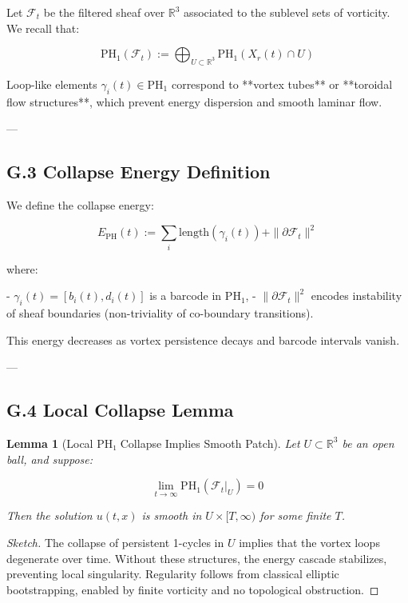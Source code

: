 \documentclass[11pt]{article}
\newtheorem{lemma}[theorem]{Lemma}
\begin{document}
Let \( \mathcal{F}_t \) be the filtered sheaf over \( \mathbb{R}^3 \) associated to the sublevel sets of vorticity.  
We recall that:

\[
\mathrm{PH}_1(\mathcal{F}_t) := \bigoplus_{U \subset \mathbb{R}^3} \mathrm{PH}_1(X_r(t) \cap U)
\]

Loop-like elements \( \gamma_i(t) \in \mathrm{PH}_1 \) correspond to **vortex tubes** or **toroidal flow structures**, which prevent energy dispersion and smooth laminar flow.

---

\subsection*{G.3 Collapse Energy Definition}

We define the collapse energy:

\[
E_{\mathrm{PH}}(t) := \sum_i \mathrm{length}(\gamma_i(t)) + \|\partial \mathcal{F}_t\|^2
\]

where:

- \( \gamma_i(t) = [b_i(t), d_i(t)] \) is a barcode in \( \mathrm{PH}_1 \),
- \( \|\partial \mathcal{F}_t\|^2 \) encodes instability of sheaf boundaries (non-triviality of co-boundary transitions).

This energy decreases as vortex persistence decays and barcode intervals vanish.

---

\subsection*{G.4 Local Collapse Lemma}

\begin{lemma}[Local PH₁ Collapse Implies Smooth Patch]
Let \( U \subset \mathbb{R}^3 \) be an open ball, and suppose:

\[
\lim_{t \to \infty} \mathrm{PH}_1(\mathcal{F}_t|_U) = 0
\]

Then the solution \( u(t,x) \) is smooth in \( U \times [T, \infty) \) for some finite \( T \).
\end{lemma}

\begin{proof}[Sketch]
The collapse of persistent 1-cycles in \( U \) implies that the vortex loops degenerate over time.  
Without these structures, the energy cascade stabilizes, preventing local singularity.  
Regularity follows from classical elliptic bootstrapping, enabled by finite vorticity and no topological obstruction.
\end{proof}
\end{document}
